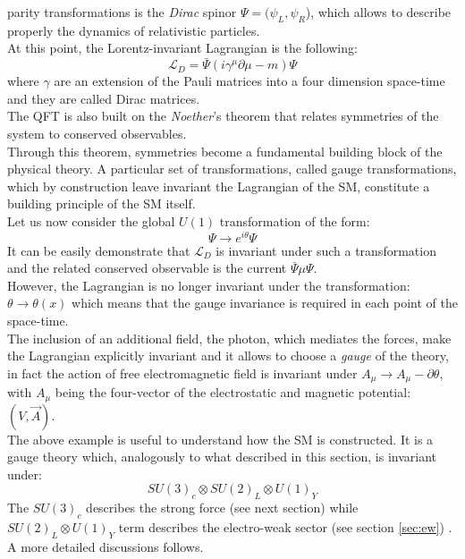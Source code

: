 parity transformations is the \textit{Dirac} spinor $\Psi = (\psi_{L},\psi_{R}$), which allows to describe properly the dynamics of relativistic particles.
\vspace{\baselineskip}
\\At this point, the Lorentz-invariant Lagrangian is the following:
\begin{equation}
	\mathcal{L}_D  =  \bar{\Psi}(i\gamma^{\mu}\partial{\mu}-m)\Psi
\end{equation}
where $\gamma$ are an extension of the Pauli matrices into a four dimension space-time and they are called Dirac matrices.
\vspace{\baselineskip}
\\The QFT is also built on the \textit{Noether}’s theorem that relates symmetries of the system to conserved observables.\\
Through this theorem, symmetries become a fundamental building block of the physical theory. 
A particular set of transformations, called gauge transformations, which by construction leave invariant the Lagrangian of the SM, 
constitute a building principle of the SM itself. 
\vspace{\baselineskip}
\\Let us now consider the global $U(1)$\footnotemark {}
transformation of the form: 
\begin{equation}
	\Psi \rightarrow e^{i\theta}\Psi
\end{equation}
It can be easily  demonstrate that $\mathcal{L}_D$ is invariant under such a transformation and the related conserved observable is
the current $\bar{\Psi}\mu\Psi$. \\
However, the Lagrangian is no longer invariant under the transformation: $\theta\rightarrow\theta (x)$ which means that the gauge 
invariance is required in each point of the space-time.
\\The inclusion of an additional field, the photon, which mediates the forces, make the Lagrangian explicitly invariant and it allows
to choose a \textit{gauge} of the theory, in fact the action of free electromagnetic field is invariant under $A_{\mu}\rightarrow A_{\mu}-\partial\theta$,
with $A_{\mu}$ being the four-vector of the electrostatic and magnetic potential: $(V,\vec{A})$.
\vspace{\baselineskip}
\\The above example is useful to understand how the SM is constructed. It is a gauge theory which, analogously to what described in
this section, is invariant under:
\begin{equation} 
	SU(3)_{c} \otimes SU(2)_{L} \otimes U(1)_{Y}
\end{equation}
The $SU(3)_{c}$ describes the strong force (see next section) while $SU(2)_{L} \otimes U(1)_{Y}$ term describes the electro-weak sector (see section \ref{sec:ew}) . 
A more detailed discussions follows.

